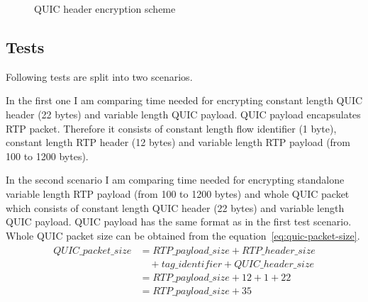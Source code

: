 \begin{figure}[h]
    \centering
    \caption{QUIC header encryption scheme}
    \label{fig:header_enc}
\end{figure}

\subsection{Tests}
\label{subsec:tests}
Following tests are split into two scenarios.

In the first one I am comparing time needed for encrypting constant length QUIC header (22 bytes) and variable length QUIC payload.
QUIC payload encapsulates RTP packet.
Therefore it consists of constant length flow identifier (1 byte), constant length RTP header (12 bytes) and variable length RTP payload (from 100 to 1200 bytes).

In the second scenario I am comparing time needed for encrypting standalone variable length RTP payload (from 100 to 1200 bytes) and whole QUIC packet which consists of constant length QUIC header (22 bytes) and variable length QUIC payload.
QUIC payload has the same format as in the first test scenario.
Whole QUIC packet size can be obtained from the equation~\ref{eq:quic-packet-size}.
\begin{align}
    \begin{split}
        QUIC\_packet\_size & = RTP\_payload\_size + RTP\_header\_size \\
        & \quad + tag\_identifier + QUIC\_header\_size \\
        & = RTP\_payload\_size + 12 + 1 + 22 \\
        & = RTP\_payload\_size + 35
    \end{split}
    \label{eq:quic-packet-size}
\end{align}

